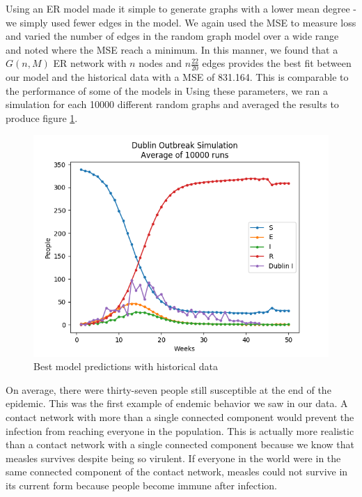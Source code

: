 \documentclass[conference]{IEEEtran}
\begin{document}
Using an ER model made it simple to generate graphs with a lower mean degree - we simply used fewer edges in the model. We again used the MSE to measure loss and varied the number of edges in the random graph model over a wide range and noted where the MSE reach a minimum. In this manner, we found that a $G(n,M)$ ER network with $n$ nodes and $n\frac{22}{20}$ edges provides the best fit between our model and the historical data with a MSE of 831.164. This is comparable to the performance of some of the models in \cite{Montalan19} Using these parameters, we ran a simulation for each 10000 different random graphs and averaged the results to produce figure \ref{fig:best_sim}.
\begin{figure}[t]
    \centering
    \includegraphics[scale=0.5]{images/dublin_sim.png}
    \caption{Best model predictions with historical data}
    \label{fig:best_sim}
\end{figure}

On average, there were thirty-seven people still susceptible at the end of the epidemic. This was the first example of endemic behavior we saw in our data. A contact network with more than a single connected component would prevent the infection from reaching everyone in the population. This is actually more realistic than a contact network with a single connected component because we know that measles survives despite being so virulent. If everyone in the world were in the same connected component of the contact network, measles could not survive in its current form because people become immune after infection.
\end{document}
